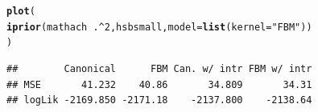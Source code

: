 \documentclass[]{beamer}\usepackage[]{graphicx}\usepackage[]{color}
\makeatletter
\newcommand{\hlnum}[1]{\textcolor[rgb]{0.686,0.059,0.569}{#1}}%
\newcommand{\hlstr}[1]{\textcolor[rgb]{0.192,0.494,0.8}{#1}}%
\newcommand{\hlopt}[1]{\textcolor[rgb]{0,0,0}{#1}}%
\newcommand{\hlstd}[1]{\textcolor[rgb]{0.345,0.345,0.345}{#1}}%
\newcommand{\hlkwc}[1]{\textcolor[rgb]{0.333,0.667,0.333}{#1}}%
\newcommand{\hlkwd}[1]{\textcolor[rgb]{0.737,0.353,0.396}{\textbf{#1}}}%
\newenvironment{kframe}{%
 \def\at@end@of@kframe{}%
 \ifinner\ifhmode%
  \def\at@end@of@kframe{\end{minipage}}%
  \begin{minipage}{\columnwidth}%
 \fi\fi%
 \def\FrameCommand##1{\hskip\@totalleftmargin \hskip-\fboxsep
 \colorbox{shadecolor}{##1}\hskip-\fboxsep
     \hskip-\linewidth \hskip-\@totalleftmargin \hskip\columnwidth}%
 \MakeFramed {\advance\hsize-\width
   \@totalleftmargin\z@ \linewidth\hsize
   \@setminipage}}%
 {\par\unskip\endMakeFramed%
 \at@end@of@kframe}
\newenvironment{knitrout}{}{} %
\makeatother
\begin{document}
\newsavebox{\ipriordemog}
\begin{lrbox}{\ipriordemog}
\begin{knitrout}\small
{}\color{fgcolor}\begin{kframe}
\begin{alltt}
\hlkwd{plot}\hlstd{(}
  \hlkwd{iprior}\hlstd{(mathach} \hlopt{~} \hlstd{.} \hlopt{^} \hlnum{2}\hlstd{, hsbsmall,} \hlkwc{model} \hlstd{=} \hlkwd{list}\hlstd{(}\hlkwc{kernel} \hlstd{=} \hlstr{"FBM"}\hlstd{))}
\hlstd{)}
\end{alltt}
\end{kframe}
\end{knitrout}
\end{lrbox}



\newsavebox{\ipriordemoh}
\begin{lrbox}{\ipriordemoh}
\begin{knitrout}\small
{}\color{fgcolor}\begin{kframe}
\begin{verbatim}
##        Canonical      FBM Can. w/ intr FBM w/ intr
## MSE       41.232    40.86       34.809       34.31
## logLik -2169.850 -2171.18    -2137.800    -2138.64
\end{verbatim}
\end{kframe}
\end{knitrout}
\end{lrbox}
\end{document}
